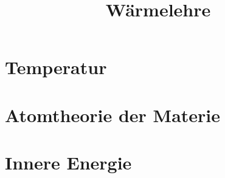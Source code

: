 \documentclass[12pt,a4paper,twoside]{article}
\title{Wärmelehre}
\date{}
\def\dir{./Aufgaben_Waerme/}
\newcommand{\Einbinden}[1]{}
\begin{document}
\maketitle




\section*{Temperatur}

\Einbinden{\dir/lueckentext_temperatur.tex}
\newpage

\section*{Atomtheorie der Materie}
\Einbinden{\dir/lueckentext_atomtheorie01.tex}




\section*{Innere Energie}
\Einbinden{\dir/lueckentext_innereenergie.tex}

\newpage





\end{document}
